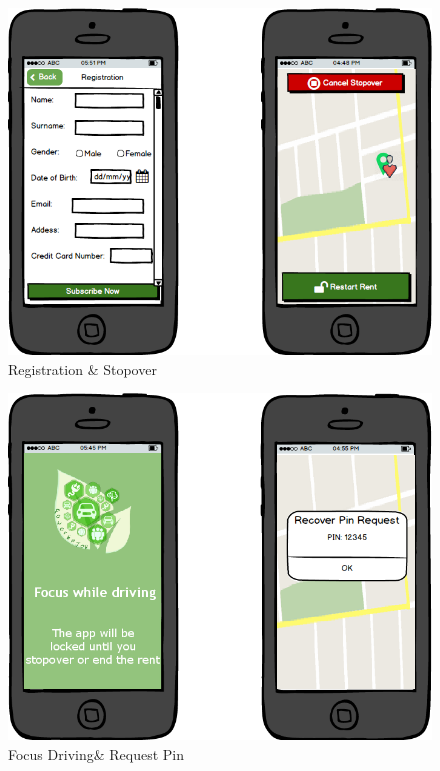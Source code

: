 \documentclass[english]{article}
\begin{document}
				\begin{figure}[H]
					\centering
					\includegraphics[scale=0.4]{./Mockups/powerEnjoyUser/singUp+stopOver.png}%
					\caption{Registration \& Stopover}
				\end{figure}
				\begin{figure}[H]
					\centering
					\includegraphics[scale=0.4]{./Mockups/powerEnjoyUser/focusDriving+requestPin.png}%
					\caption{Focus Driving\& Request Pin}
				\end{figure}
\end{document}
